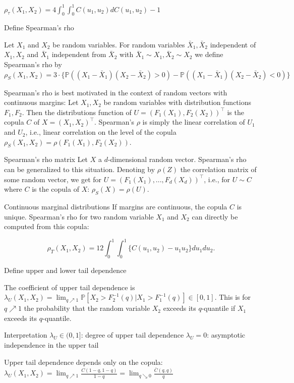 \(\rho_\tau(X_1, X_2) = 4 \int_0^1 \int_0^1 C(u_1, u_2) dC(u_1, u_2) - 1\)


Define Spearman’s rho


Let \(X_1\) and \(X_2\) be random variables. For random variables \(\bar{X}_1, \bar{X}_2\) independent of \(X_1, X_2\) and \(\bar{X}_1\) 
independent from \(\bar{X}_2\) with \(\bar{X}_1 \sim X_1, \bar{X}_2 \sim X_2\) we define Spearman's rho by
\(\rho_S(X_1, X_2) = 3 \cdot \{\mathbb{P}((X_1 - \bar{X}_1)(X_2 - \bar{X}_2) > 0) - \mathbb{P}((X_1 - \bar{X}_1)(X_2 - \bar{X}_2) < 0)\}\)

Spearman's rho is best motivated in the context of random vectors with continuous margins:
Let \(X_1, X_2\) be random variables with distribution functions \(F_1, F_2\). Then the distributions function of
\(U = (F_1(X_1), F_2(X_2))^\top\)
is the copula \(C\) of \(X = (X_1, X_2)^\top\).
Spearman's \(\rho\) is simply the linear correlation of \(U_1\) and \(U_2\), i.e., linear correlation on the level of the copula
\(\rho_S(X_1, X_2) = \rho(F_1(X_1), F_2(X_2))\).


Spearman's rho matrix
Let \(X\) a \(d\)-dimensional random vector. Spearman's rho can be generalized to this situation.
Denoting by \(\rho(Z)\) the correlation matrix of some random vector, 
we get for \(U = (F_1(X_1), ..., F_d(X_d))^\top\), i.e., for \(U \sim C\) where \(C\) is the copula of \(X\):
\(\rho_S(X) = \rho(U).\)

Continuous marginal distributions
If margins are continuous, the copula \(C\) is unique. Spearman's rho for two random variable 
\(X_1\) and \(X_2\) can directly be computed from this copula:

\[\rho_T(X_1, X_2) = 12 \int_0^1 \int_0^1 \{C(u_1, u_2) - u_1 u_2\} du_1 du_2.\]

Define upper and lower tail dependence

The coefficient of upper tail dependence is
\(\lambda_U(X_1, X_2) = \lim_{q \nearrow 1} \mathbb{P}[X_2 > F_2^{-1}(q)|X_1 > F_1^{-1}(q)] \in [0, 1].\)
This is for \(q \nearrow 1\) the probability that the random variable \(X_2\) 
exceeds its \(q\)-quantile if \(X_1\) exceeds its \(q\)-quantile.

Interpretation
\(\lambda_U \in (0, 1]\): degree of upper tail dependence
\(\lambda_U = 0\): asymptotic independence in the upper tail

Upper tail dependence depends only on the copula:
\(\lambda_U(X_1, X_2) = \lim_{q \nearrow 1} \frac{C(1 - q, 1 - q)}{1 - q} = \lim_{q \searrow 0} \frac{\bar{C}(q, q)}{q}\)

